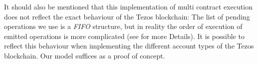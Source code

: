 \begin{itemize}
		It should also be mentioned that this implementation of multi contract execution
		does not reflect the exact behaviour of the Tezos blockchain:
		The list of pending operations we use is a \emph{FIFO} structure,
		but in reality the order of execution of emitted operations is more complicated
		(see \cite{devres} for more Details).
		It is possible to reflect this behaviour when implementing
		the different account types of the Tezos blockchain.
		Our model suffices as a proof of concept.
\end{itemize}


\begin{comment}

\subsubsection{Shadow Stack and extended Instructions/Programs}\label{subsec:shadow}

\ADT{DIP} and \ADT{ITER} are special in that they need a second stack to be executed:
During the execution of the sub-program of \verb=DIP= the top \verb=n= elements must be stored
to be later retrieved when sub-program execution has terminated.
Likewise for \verb=ITER=, which consumes the list at the top of the stack
by executing its sub-program for every list element.
Here the currently remaining list has to be stored during sub-program execution.
Since the sub-programs can also contain such instructions that need to store data away for later,
a second stack is needed, as well as new instructions to operate on it:
To execute \texttt{DIP n prg ; \emph{remainingProg}}, the top \verb=n= elements of the
main stack are transfered to this second stack (we call it the \emph{shadow stack}) and
the instruction is replaced by \verb=prg= followed by the \emph{shadow instruction} \verb=DIP'=
which retrieves them from the shadow stack and puts them back onto the mainstack
before continuing execution with \texttt{\emph{remainingProg}}.
For the instruction \verb=ITER prg= the list on top of the main stack will be placed
onto the shadow stack and the instruction will be replaced by its shadow version \verb=ITER' prg=
which does all the actual work: It checks if the list at the top of the shadow stack is empty.
If so, it will be dropped and execution continues.
If not, the first element in the list will be moved to the top of the main stack and
\verb=prg= will be executed. After that \verb=ITER'= is executed again to check the list
until all elements have been iterated over.


\end{comment}
